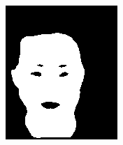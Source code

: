 \begin{figure}[h]
\begin{subfigure}[b]{0.18\textwidth}
         \includegraphics[width=\textwidth]{images/results/base_st/dd110.color.d3_skinny_2.png}
     \end{subfigure}
    \hfill
     \begin{subfigure}[b]{0.18\textwidth}
         \centering

\end{subfigure}
\end{figure}
